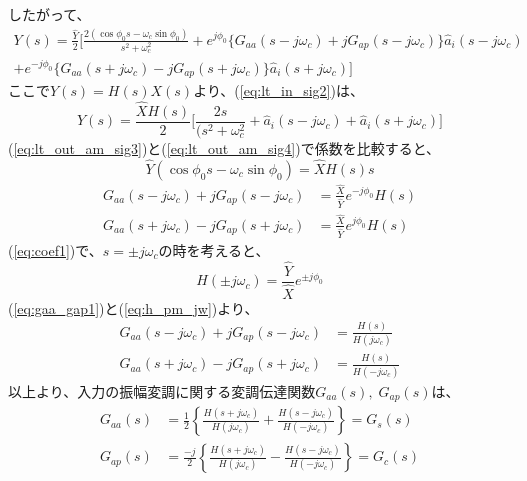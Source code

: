 \documentclass[book]{jlreq}
\begin{document}
%
したがって、
%
\begin{multline}
    Y(s) = \frac{\hat{Y}}{2}\biggr [\frac{2(\cos\phi_0 s - \omega_c\sin\phi_0)}{s^2+\omega_c^2}
        + e^{j\phi_0}\{G_{aa}(s-j\omega_c)+j G_{ap}(s-j\omega_c)\}\hat{a}_i(s-j\omega_c) \\
        + e^{-j\phi_0}\{G_{aa}(s+j\omega_c)- j G_{ap}(s+j\omega_c)\}\hat{a}_i(s+j\omega_c)\biggl ]
    \label{eq:lt_out_am_sig3}
\end{multline}
%
ここで$Y(s) = H(s) X(s)$より、(\ref{eq:lt_in_sig2})は、
%
\begin{equation}
    Y(s) = \frac{\hat{X}H(s)}{2}\biggl [\frac{2 s}{(s^2+\omega_c^2} + \hat{a}_i(s - j\omega_c) + \hat{a}_i(s+j\omega_c)  \biggr ]
    \label{eq:lt_out_am_sig4}
\end{equation}
%
(\ref{eq:lt_out_am_sig3})と(\ref{eq:lt_out_am_sig4})で係数を比較すると、
%
\begin{equation}
    \hat{Y}(\cos\phi_0 s - \omega_c\sin\phi_0) = \hat{X}H(s) s
    \label{eq:coef1}
\end{equation}
%
\begin{equation}
    \begin{split}
        G_{aa}(s-j\omega_c) + j G_{ap}(s-j\omega_c) &= \frac{\hat{X}}{\hat{Y}}e^{-j\phi_0}H(s) \\
        G_{aa}(s+j\omega_c) - j G_{ap}(s+j\omega_c) &= \frac{\hat{X}}{\hat{Y}}e^{j\phi_0}H(s)
    \end{split}
    \label{eq:gaa_gap1}
\end{equation}
%
(\ref{eq:coef1})で、$s = \pm j\omega_c$の時を考えると、
%
\begin{equation}
    H(\pm j\omega_c) = \frac{\hat{Y}}{\hat{X}} e^{\pm j\phi_0}
    \label{eq:h_pm_jw}
\end{equation}
%
(\ref{eq:gaa_gap1})と(\ref{eq:h_pm_jw})より、
%
\begin{equation}
    \begin{split}
        G_{aa}(s-j\omega_c) + j G_{ap}(s-j\omega_c) &= \frac{H(s)}{H(j\omega_c)} \\
        G_{aa}(s+j\omega_c) - j G_{ap}(s+j\omega_c) &= \frac{H(s)}{H(-j\omega_c)}
    \end{split}
    \label{eq:gaa_gap2}
\end{equation}
%
以上より、入力の振幅変調に関する変調伝達関数$G_{aa}(s),\;G_{ap}(s)$は、
%
\begin{equation}
    \begin{split}
        G_{aa}(s) &= \frac{1}{2}\left\{\frac{H(s+j\omega_c)}{H(j\omega_c)} + \frac{H(s-j\omega_c)}{H(-j\omega_c)}\right\} = G_s(s)\\
        G_{ap}(s) &= \frac{-j}{2}\left\{\frac{H(s+j\omega_c)}{H(j\omega_c)} - \frac{H(s-j\omega_c)}{H(-j\omega_c)}\right\} = G_c(s)
    \end{split}
\end{equation}
\end{document}
